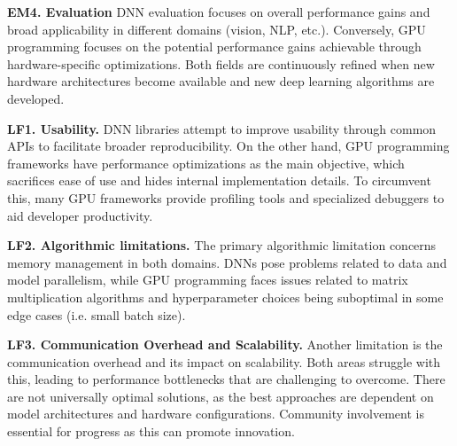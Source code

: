\textbf{EM4. Evaluation}
DNN evaluation focuses on overall performance gains and broad applicability in different domains (vision,
NLP, etc.). Conversely, GPU programming focuses on the potential performance gains achievable through
hardware-specific optimizations. Both fields are continuously refined when new hardware architectures
become available and new deep learning algorithms are developed.

\textbf{LF1. Usability.}
DNN libraries attempt to improve usability through common APIs to facilitate broader
reproducibility. On the other hand, GPU programming frameworks have performance optimizations as
the main objective, which sacrifices ease of use and hides internal implementation details.
To circumvent this, many GPU frameworks provide profiling tools and specialized debuggers to aid
developer productivity.

\textbf{LF2. Algorithmic limitations.}
The primary algorithmic limitation concerns memory management in both domains.
DNNs pose problems related to data and model parallelism, while GPU programming faces issues
related to matrix multiplication algorithms and hyperparameter choices being suboptimal in some edge cases
(i.e. small batch size).

\textbf{LF3. Communication Overhead and Scalability.}
Another limitation is the communication overhead and its impact on scalability. Both areas struggle
with this, leading to performance bottlenecks that are challenging to overcome. There are not universally
optimal solutions, as the best approaches are dependent on model architectures and hardware configurations.
Community involvement is essential for progress as this can promote innovation.
